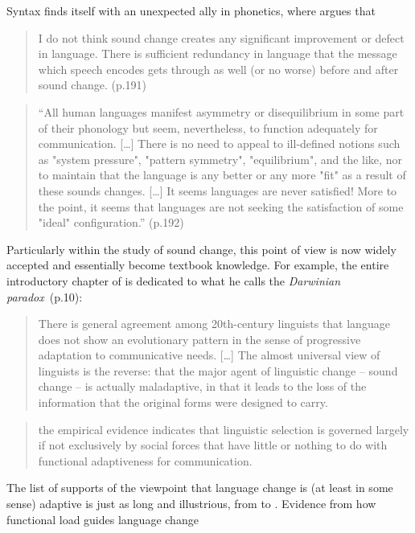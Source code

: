 Syntax finds itself with an unexpected ally in phonetics, where \citet{Ohala1989} argues that
\begin{quote}
I do not think sound change creates any significant improvement or defect in language. There is sufficient redundancy in language that the message which speech encodes gets through as well (or no worse) before and after sound change. (p.191)
\end{quote}

\begin{quote}
``All human languages manifest asymmetry or disequilibrium in some part of their phonology but seem, nevertheless, to function adequately for communication. [\ldots] There is no need to appeal to ill-defined notions such as "system pressure", "pattern symmetry", "equilibrium", and the like, nor to maintain that the language is any better or any more "fit" as a result of these sounds changes. [\ldots] It seems languages are never satisfied! More to the point, it seems that languages are not seeking the satisfaction of some "ideal" configuration.'' (p.192)
\end{quote}

Particularly within the study of sound change, this point of view is now widely accepted and essentially become textbook knowledge. For example, the entire introductory chapter of \citet{Labov2001} is dedicated to what he calls the \emph{Darwinian paradox}~(p.10): 
\begin{quote}
There is general agreement among 20th-century linguists that language does not show an evolutionary pattern in the sense of progressive adaptation to communicative needs. [\ldots] The almost universal view of linguists is the reverse: that the major agent of linguistic change -- sound change -- is actually maladaptive, in that it leads to the loss of the information that the original forms were designed to carry.
\end{quote}

\citet[p.39]{Croft2000}
\begin{quote}
the empirical evidence indicates that linguistic selection is governed largely if not exclusively by social forces that have little or nothing to do with functional adaptiveness for communication.
\end{quote}

The list of supports of the viewpoint that language change is (at least in some sense) adaptive is just as long and illustrious, from \citet{Jespersen1949} to \citet{Vennemann1993}.
Evidence from how functional load guides language change~\citep{Wedel2013short}


